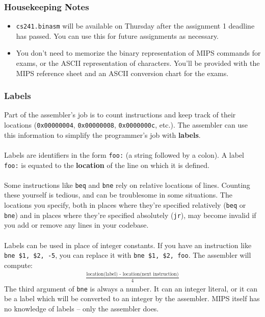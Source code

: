 \documentclass[]{article}
\theoremstyle{definition}
\newcommand{\lecture}[1]{\marginpar{{\footnotesize $\leftarrow$ \underline{#1}}}}
\begin{document}
		\subsubsection{Housekeeping Notes}
			\begin{itemize}
				\item \verb+cs241.binasm+ will be available on Thursday after the assignment 1 deadline has passed. You can use this for future assignments as necessary.
				\item You don't need to memorize the binary representation of MIPS commands for exams, or the ASCII representation of characters. You'll be provided with the MIPS reference sheet and an ASCII conversion chart for the exams.
			\end{itemize}
			\subsubsection{Labels} \lecture{January 16, 2013}
				Part of the assembler's job is to count instructions and keep track of their locations (\verb+0x00000004+, \verb+0x00000008+, \verb+0x0000000c+, etc.). The assembler can use this information to simplify the programmer's job with \textbf{labels}.
				\\ \\
				Labels are identifiers in the form \verb+foo:+ (a string followed by a colon). A label \verb+foo:+ is equated to the \textbf{location} of the line on which it is defined.
				\\ \\
				Some instructions like \verb+beq+ and \verb+bne+ rely on relative locations of lines. Counting these yourself is tedious, and can be troublesome in some situations. The locations you specify, both in places where they're specified relatively (\verb+beq+ or \verb+bne+) and in places where they're specified absolutely (\verb+jr+), may become invalid if you add or remove any lines in your codebase.
				\\ \\
				Labels can be used in place of integer constants. If you have an instruction like \verb+bne $1, $2, -5+, you can replace it with \verb+bne $1, $2, foo+. The assembler will compute:
				\begin{align*}
					\frac{\text{location(label) - location(next instruction)}}{4}
				\end{align*}
				The third argument of \verb+bne+ is always a number. It can an integer literal, or it can be a label which will be converted to an integer by the assembler. MIPS itself has no knowledge of labels -- only the assembler does.
\end{document}
